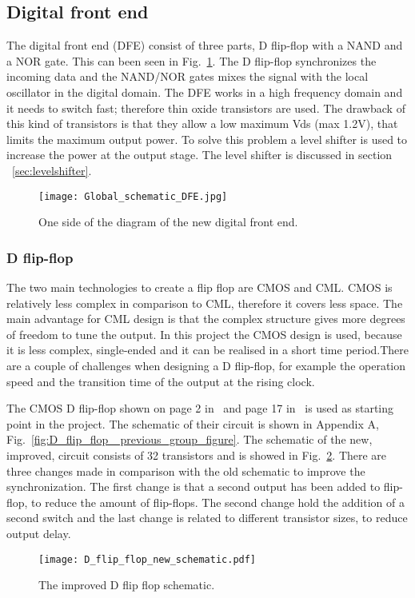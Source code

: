 \makeatletter
\newcommand*{\textoverline}[1]{$\overline{\hbox{#1}}\m@th$}
\makeatother

\subsection{Digital front end}\label{sec:frontend}
The digital front end (DFE) consist of three parts, D flip-flop with a NAND and a NOR gate. This can been seen in Fig.~\ref{fig:Global_schematic_DFE_figure}. The D flip-flop synchronizes the incoming data and the NAND/NOR gates mixes the signal with the local oscillator in the digital domain. The DFE works in a high frequency domain and it needs to switch fast; therefore thin oxide transistors are used. The drawback of this kind of transistors is that they allow a low maximum Vds (max 1.2V), that limits the maximum output power. To solve this problem a level shifter is used to increase the power at the output stage. The level shifter is discussed in section ~\ref{sec:levelshifter}. 

\begin{figure}[h]
\texttt{[image: Global\_schematic\_DFE.jpg]}
\caption{One side of the diagram of the new digital front end.}
\label{fig:Global_schematic_DFE_figure}
\end{figure}

\subsubsection{D flip-flop}\label{sec:frontend}
The two main technologies to create a flip flop are CMOS and CML. CMOS is relatively less complex in comparison to CML, therefore it covers less space. The main advantage for CML design is that the complex structure gives more degrees of freedom to tune the output. In this project the CMOS design is used, because it is less complex, single-ended and it can be realised in a short time period.There are a couple of challenges when designing a D flip-flop, for example the operation speed and the transition time of the output at the rising clock.

The CMOS D flip-flop shown on page 2 in~\cite{powerdac} and page 17 in~\cite{coursebook} is used as starting point in the project. The schematic of their circuit is shown in Appendix A, Fig.~\ref{fig:D_flip_flop_ previous_group_figure}. The schematic of the new, improved, circuit consists of 32 transistors and is showed in Fig.~\ref{fig:D_flip_flop_schematic_figure}. There are three changes made in comparison with the old schematic to improve the synchronization. The first change is that a second output has been added to flip-flop, to reduce the amount of flip-flops. The second change hold the addition of a second switch and the last change is related to different transistor sizes, to reduce output delay.
\begin{figure}[h]
\texttt{[image: D\_flip\_flop\_new\_schematic.pdf]}
\caption{The improved D flip flop schematic.}
\label{fig:D_flip_flop_schematic_figure}
\end{figure}

